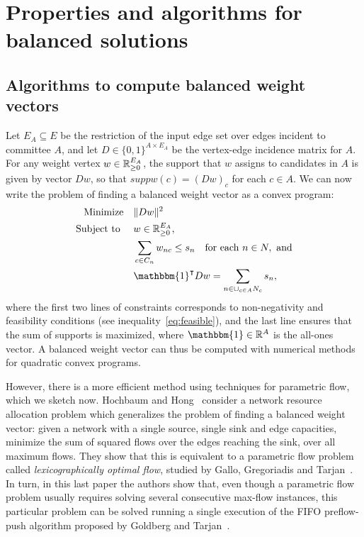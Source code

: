 \section{Properties and algorithms for balanced solutions} \label{s:balanced}




\subsection{Algorithms to compute balanced weight vectors}

Let $E_A\subseteq E$ be the restriction of the input edge set over edges incident to committee $A$, and let $D\in\{0,1\}^{A\times E_A}$ be the vertex-edge incidence matrix for $A$. 
For any weight vertex $w\in\mathbb{R}_{\geq 0}^{E_A}$, the support that $w$ assigns to candidates in $A$ is given by vector $Dw$, so that $suppw(c)=(Dw)_c$ for each $c\in A$. 
We can now write the problem of finding a balanced weight vector as a convex program:
\begin{align*}
    \text{Minimize} \quad & \|Dw\|^2 \\
    \text{Subject to } \quad & w\in\R^{E_A}, \\
    & \sum_{c\in C_n} w_{nc} \leq s_n \quad \text{for each } n\in N, \text{ and} \\
    & \mathbbm{1}^{\intercal} Dw = \sum_{n\in \cup_{c\in A} N_c} s_n,
\end{align*}
where the first two lines of constraints corresponds to non-negativity and feasibility conditions (see inequality~\ref{eq:feasible}), and the last line ensures that the sum of supports is maximized, where $\mathbbm{1}\in\mathbb{R}^A$ is the all-ones vector. 
A balanced weight vector can thus be computed with numerical methods for quadratic convex programs.

However, there is a more efficient method using techniques for parametric flow, which we sketch now. Hochbaum and Hong~\cite[Section 6]{hochbaum1995strongly} consider a network resource allocation problem which generalizes the problem of finding a balanced weight vector: given a network with a single source, single sink and edge capacities, minimize the sum of squared flows over the edges reaching the sink, over all maximum flows. 
They show that this is equivalent to a parametric flow problem called \emph{lexicographically optimal flow}, studied by Gallo, Gregoriadis and Tarjan~\cite{gallo1989fast}. 
In turn, in this last paper the authors show that, even though a parametric flow problem usually requires solving several consecutive max-flow instances, this particular problem can be solved running a single execution of the FIFO preflow-push algorithm proposed by Goldberg and Tarjan~\cite{goldberg1988new}.

